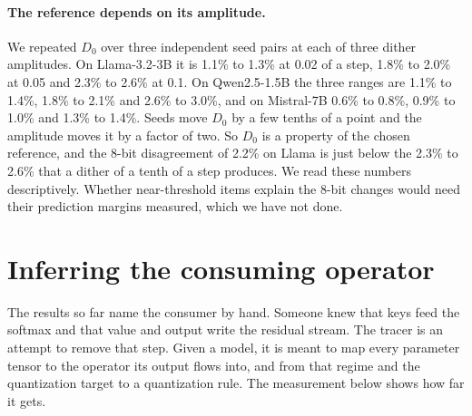 \documentclass[journal,onecolumn]{IEEEtran}
\begin{document}
\paragraph{The reference depends on its amplitude.} We repeated $D_0$ over three independent
seed pairs at each of three dither amplitudes. On Llama-3.2-3B it is 1.1\% to 1.3\% at 0.02 of a
step, 1.8\% to 2.0\% at 0.05 and 2.3\% to 2.6\% at 0.1. On Qwen2.5-1.5B the three ranges are 1.1\%
to 1.4\%, 1.8\% to 2.1\% and 2.6\% to 3.0\%, and on Mistral-7B 0.6\% to 0.8\%, 0.9\% to 1.0\% and
1.3\% to 1.4\%. Seeds move $D_0$ by a few tenths of a point and the amplitude moves it by a factor
of two. So $D_0$ is a property of the chosen reference, and the 8-bit disagreement of 2.2\% on
Llama is just below the 2.3\% to 2.6\% that a dither of a tenth of a step produces. We read these numbers
descriptively. Whether near-threshold items explain the 8-bit changes would need their
prediction margins measured, which we have not done.

\section{Inferring the consuming operator}\label{supp:trace}

The results so far name the consumer by hand. Someone knew that keys feed the softmax and that
value and output write the residual stream. The tracer is an attempt to remove that step. Given a model, it is meant to map
every parameter tensor to the operator its output flows into, and from that regime and the
quantization target to a quantization rule. The measurement below shows how far it gets.
\end{document}
